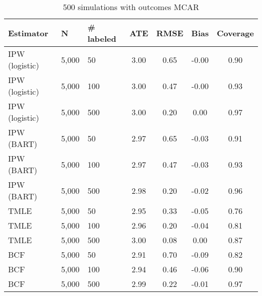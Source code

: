 \begin{table}[ht]
\centering
\begingroup\small
\begin{tabular}{lllcc>{\columncolor[gray]{.9}}c>{\columncolor[gray]{.9}}c}
  \hline
Estimator & N & \# labeled & ATE & RMSE & Bias & Coverage \\ 
  \hline
  IPW (logistic) & 5,000 &  50 & 3.00 & 0.65 & -0.00 & 0.90 \\ 
  IPW (logistic) & 5,000 & 100 & 3.00 & 0.47 & -0.00 & 0.93 \\ 
  IPW (logistic) & 5,000 & 500 & 3.00 & 0.20 & 0.00 & 0.97 \\ 
  IPW (BART) & 5,000 &  50 & 2.97 & 0.65 & -0.03 & 0.91 \\ 
  IPW (BART) & 5,000 & 100 & 2.97 & 0.47 & -0.03 & 0.93 \\ 
  IPW (BART) & 5,000 & 500 & 2.98 & 0.20 & -0.02 & 0.96 \\ 
  TMLE & 5,000 &  50 & 2.95 & 0.33 & -0.05 & 0.76 \\ 
  TMLE & 5,000 & 100 & 2.96 & 0.20 & -0.04 & 0.81 \\ 
  TMLE & 5,000 & 500 & 3.00 & 0.08 & 0.00 & 0.87 \\ 
  BCF & 5,000 &  50 & 2.91 & 0.70 & -0.09 & 0.82 \\ 
  BCF & 5,000 & 100 & 2.94 & 0.46 & -0.06 & 0.90 \\ 
  BCF & 5,000 & 500 & 2.99 & 0.22 & -0.01 & 0.97 \\ 
   \hline
\end{tabular}
\endgroup
\caption{500 simulations with outcomes MCAR} 
\end{table}
